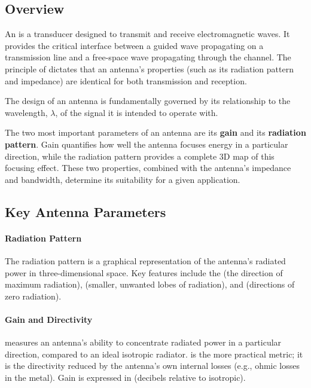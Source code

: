 \subsection{Overview}

An  is a transducer designed to transmit and receive electromagnetic waves. It provides the critical interface between a guided wave propagating on a transmission line and a free-space wave propagating through the channel. The principle of  dictates that an antenna's properties (such as its radiation pattern and impedance) are identical for both transmission and reception.

The design of an antenna is fundamentally governed by its relationship to the wavelength, $\lambda$, of the signal it is intended to operate with.

\begin{keyconcept}
    The two most important parameters of an antenna are its \textbf{gain} and its \textbf{radiation pattern}. Gain quantifies how well the antenna focuses energy in a particular direction, while the radiation pattern provides a complete 3D map of this focusing effect. These two properties, combined with the antenna's impedance and bandwidth, determine its suitability for a given application.
\end{keyconcept}


\subsection{Key Antenna Parameters}

\paragraph{Radiation Pattern}
The radiation pattern is a graphical representation of the antenna's radiated power in three-dimensional space. Key features include the  (the direction of maximum radiation),  (smaller, unwanted lobes of radiation), and  (directions of zero radiation).

\paragraph{Gain and Directivity}
 measures an antenna's ability to concentrate radiated power in a particular direction, compared to an ideal isotropic radiator.  is the more practical metric; it is the directivity reduced by the antenna's own internal losses (e.g., ohmic losses in the metal). Gain is expressed in  (decibels relative to isotropic).

